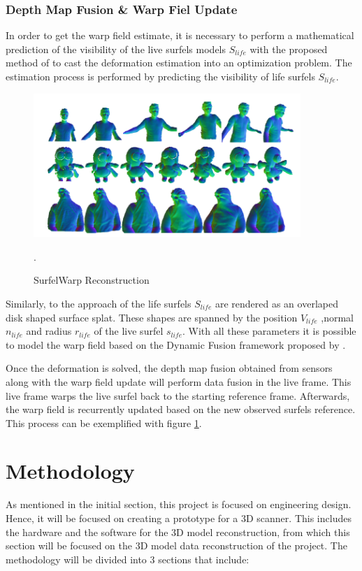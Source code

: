 \documentclass[12pt]{report}
\begin{document}
\subsection{Depth Map Fusion \& Warp Fiel Update}
In order to get the warp field estimate, it is necessary to perform a mathematical prediction of the visibility of the live surfels models $S_{life}$ with the proposed method of 
to cast the deformation estimation into an optimization problem.
The estimation process is performed by predicting the visibility of life surfels $S_{life}$.
\begin{figure}[ht]%
  \centering
  \includegraphics[width=0.9\textwidth]{surfelwarp2.png}
  \caption{SurfelWarp Reconstruction}\cite[]{SurfelWarp}.
  \label{fig:surfelprocess}
\end{figure}

Similarly, to the approach of \citet{keller} the life surfels $S_{life}$  are rendered as an overlaped disk shaped surface splat. These shapes are spanned by the position $V_{life}$ 
,normal $n_{life}$ and radius $r_{life}$ of the live surfel $s_{life}$.
With all these parameters it is possible to model the warp field based on the Dynamic Fusion framework proposed by \citet*{newcombe_fox_seitz_2015}.

Once the deformation is solved, the depth map fusion obtained from sensors along with the warp field update will perform data fusion in the live frame. 
This live frame warps the live surfel back to the starting reference frame. Afterwards, the warp field is recurrently updated based on the new observed surfels reference. This process can be exemplified with figure \ref{fig:surfelprocess}.

\chapter{Methodology}
As mentioned in the initial section, this project is focused on engineering design. Hence, it will be focused on creating a prototype for a 3D scanner. 
This includes the hardware and the software for the 3D model reconstruction, from which this section will be focused on the 3D model data reconstruction of the project.
The methodology will be divided into 3 sections that include: 
\end{document}
